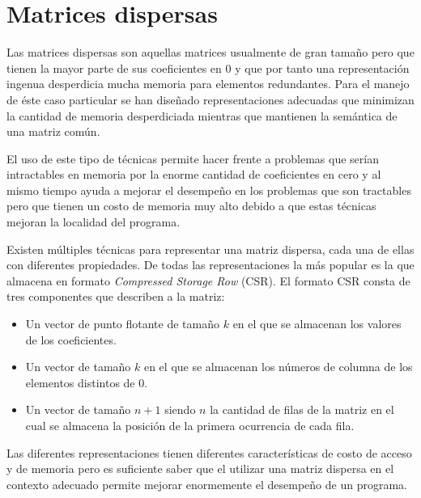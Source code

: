 \section{Matrices dispersas} \label{matrices-dispersas}
Las matrices dispersas son aquellas matrices usualmente de gran tamaño pero que tienen la mayor parte de sus coeficientes en 0 y que por tanto una representación ingenua desperdicia mucha memoria para elementos redundantes. Para el manejo de éste caso particular se han diseñado representaciones adecuadas que minimizan la cantidad de memoria desperdiciada mientras que mantienen la semántica de una matriz común.

El uso de este tipo de técnicas permite hacer frente a problemas que serían intractables en memoria por la enorme cantidad de coeficientes en cero y al mismo tiempo ayuda a mejorar el desempeño en los problemas que son tractables pero que tienen un costo de memoria muy alto debido a que estas técnicas mejoran la localidad del programa.

Existen múltiples técnicas para representar una matriz dispersa, cada una de ellas con diferentes propiedades. De todas las representaciones la más popular es la que almacena en formato \emph{Compressed Storage Row} (CSR).  El formato CSR consta de tres componentes que describen a la matriz:

\begin{itemize}
  \item Un vector de punto flotante de tamaño $k$ en el que se almacenan los valores de los coeficientes.
  \item Un vector de tamaño $k$ en el que se almacenan los números de columna de los elementos distintos de 0.
  \item Un vector de tamaño $n+1$ siendo $n$ la cantidad de filas de la matriz en el cual se almacena la posición de la primera ocurrencia de cada fila.
\end{itemize}

Las diferentes representaciones tienen diferentes características de costo de acceso y de memoria pero es suficiente saber que el utilizar una matriz dispersa en el contexto adecuado permite mejorar enormemente el desempeño de un programa.